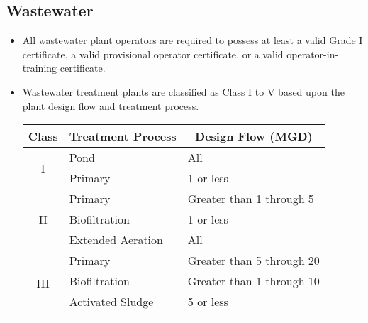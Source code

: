 \subsection{Wastewater}
\begin{itemize}
\item All wastewater plant operators are required to possess at least a valid Grade I certificate, a valid provisional operator certificate, or a valid operator-in-training certificate.
\item Wastewater treatment plants are classified as Class I to V based upon the plant design flow and treatment process. 
\begin{table}[H]
\begin{center}
\begin{tabular}{|c|l|l|}
\hline
{\textbf{Class} }                    & \multicolumn{1}{c|}{ \textbf{Treatment Process}} & \multicolumn{1}{c|}{\textbf{Design Flow (MGD)}} \\ \hline
\multirow{2}{*}{I}                       & Pond                                                  & All                                                   \\ \cline{2-3} 
                                         & Primary                                               & 1 or less                                           \\ \hline
\multirow{3}{*}{II}                      & Primary                                               & Greater than 1 through 5                          \\ \cline{2-3} 
                                         & Biofiltration                                         & 1 or less                                           \\ \cline{2-3} 
                                         & Extended Aeration                                     & All                                                   \\ \hline
\multirow{4}{*}{III}                     & Primary                                               & Greater than 5 through 20                         \\ \cline{2-3} 
                                         & Biofiltration                                         & Greater than 1 through 10                         \\ \cline{2-3} 
                                         & Activated Sludge                                      & 5 or less                                           \\ \cline{2-3} 

\end{tabular}
\end{center}
\end{table}
\end{itemize}
